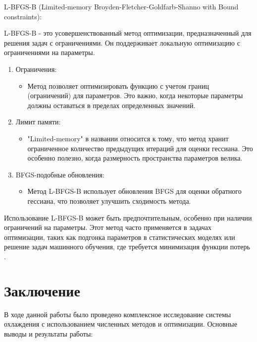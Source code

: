 \documentclass[a4paper,12pt]{article}
\theoremstyle{plain} %
\theoremstyle{definition} %
\theoremstyle{remark} %
\begin{document}
L-BFGS-B (Limited-memory Broyden-Fletcher-Goldfarb-Shanno with Bound constraints):

L-BFGS-B - это усовершенствованный метод оптимизации, предназначенный для решения задач с ограничениями. Он поддерживает локальную оптимизацию с ограничениями на параметры.

\begin{enumerate}
	\item Ограничения:
	      \begin{itemize}
		      \item Метод позволяет оптимизировать функцию с учетом границ (ограничений) для параметров. Это важно, когда некоторые параметры должны оставаться в пределах определенных значений.
	      \end{itemize}
	\item Лимит памяти:
	      \begin{itemize}
		      \item "Limited-memory" в названии относится к тому, что метод хранит ограниченное количество предыдущих итераций для оценки гессиана. Это особенно полезно, когда размерность пространства параметров велика.
	      \end{itemize}
	\item BFGS-подобные обновления:
	      \begin{itemize}
		      \item Метод L-BFGS-B использует обновления BFGS для оценки обратного гессиана, что позволяет улучшить сходимость метода.
	      \end{itemize}
\end{enumerate}

Использование L-BFGS-B может быть предпочтительным, особенно при наличии ограничений на параметры. Этот метод часто применяется в задачах оптимизации, таких как подгонка параметров в статистических моделях или решение задач машинного обучения, где требуется минимизация функции потерь \cite{limited_BFGS}.

\newpage
\section*{Заключение}

В ходе данной работы было проведено комплексное исследование системы охлаждения с использованием численных методов и оптимизации. Основные выводы и результаты работы:
\end{document}
